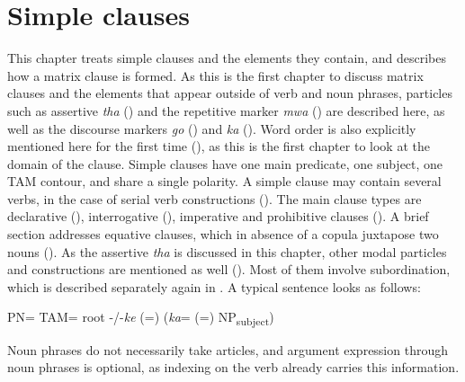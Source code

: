 
\chapter{Simple clauses} 
\label{ChapterSimpClaus} 
This chapter treats simple clauses and the elements they contain, and describes how a matrix clause is formed. As this is the first chapter to discuss matrix clauses and the elements that appear outside of verb and noun phrases, particles such as assertive \textit{tha} () and the repetitive marker \textit{mwa} () are described here, as well as the discourse markers \textit{go} () and \textit{ka} (). Word order is also explicitly mentioned here for the first time (), as this is the first chapter to look at the domain of the clause. %
Simple clauses have one main predicate, one subject, one TAM contour, and share a single polarity. A simple clause may contain several verbs, in the case of serial verb constructions (). The main clause types are declarative (), interrogative (), imperative and prohibitive clauses (). A brief section addresses equative clauses, which in absence of a copula juxtapose two nouns (). %
As the assertive \textit{tha} is discussed in this chapter, other modal particles and constructions are mentioned as well (). Most of them involve subordination, which is described separately again in . A typical sentence looks as follows:
\begin{center}
PN= TAM= root -/-\textit{ke} (=)  (\textit{ka}= (=) NP\textsubscript{subject})
\end{center}
\noindent Noun phrases do not necessarily take articles, and argument expression through noun phrases is optional, as indexing on the verb already carries this information.

